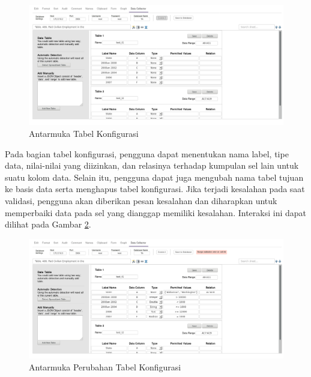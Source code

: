 	\begin{figure}[htbp]
	    \centering
	    \includegraphics[width=1.0\textwidth]{resources/chapter-4-interface-2.png}
	    \caption{Antarmuka Tabel Konfigurasi}
		\label{Antarmuka2}
	\end{figure}

	Pada bagian tabel konfigurasi, pengguna dapat menentukan nama label, tipe data, nilai-nilai yang diizinkan, dan relasinya terhadap kumpulan sel lain untuk suatu kolom data. Selain itu, pengguna dapat juga mengubah nama tabel tujuan ke basis data serta menghapus tabel konfigurasi. Jika terjadi kesalahan pada saat validasi, pengguna akan diberikan pesan kesalahan dan diharapkan untuk memperbaiki data pada sel yang dianggap memiliki kesalahan. Interaksi ini dapat dilihat pada Gambar \ref{Antarmuka3}.

	\begin{figure}[htbp]
	    \centering
	    \includegraphics[width=1.0\textwidth]{resources/chapter-4-interface-3a.png}
	    \caption{Antarmuka Perubahan Tabel Konfigurasi}
		\label{Antarmuka3}
	\end{figure}
	
